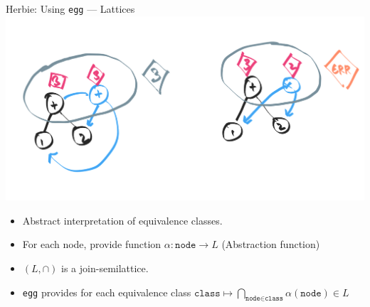 \documentclass[8pt]{beamer}
\newcommand{\node}{\texttt{node}}
\newcommand{\class}{\texttt{class}}
\newcommand{\egg}{\texttt{egg} }
\begin{document}
\begin{frame}[fragile]{Herbie: Using \egg --- Lattices}
\includegraphics[width=\textwidth]{./analysis-equivalence-classes.png}
\pause
\begin{itemize}
\item Abstract interpretation of equivalence classes.
\item For each node, provide function $\alpha: \node \rightarrow L$ (Abstraction function)
\item $(L, \cap)$ is a join-semilattice.
\item \egg provides for each equivalence class $\class \mapsto \bigcap_{\node \in \class} \alpha(\node) \in L$
\end{itemize}
\end{frame}
\end{document}
